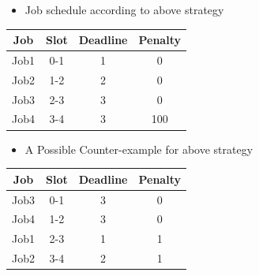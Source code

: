 \documentclass[pdftex,a4paper,12pt]{report}
\begin{document}
\begin{multicols}{2}
\begin{center}
\begin{itemize}
\item Job schedule according to above strategy
\end{itemize}
\begin{tabular}{c|c|c|c}
\hline
Job & Slot & Deadline & Penalty\\
\hline
Job1 & 0-1 & 1 & 0\\
Job2 & 1-2 & 2 & 0\\
Job3 & 2-3 & 3 & 0\\
Job4 & 3-4 & 3 & 100\\
\hline
\end{tabular}
\end{center}
\setlength{\columnseprule}{0.2pt}
\columnbreak
\begin{center}
\begin{itemize}
\item A Possible Counter-example for above strategy
\end{itemize}
\begin{tabular}{c|c|c|c}
\hline
Job & Slot & Deadline & Penalty\\
\hline
Job3 & 0-1 & 3 & 0\\
Job4 & 1-2 & 3 & 0\\
Job1 & 2-3 & 1 & 1\\
Job2 & 3-4 & 2 & 1\\
\hline
\end{tabular}
\end{center}
\end{multicols}
\newpage
\end{document}
